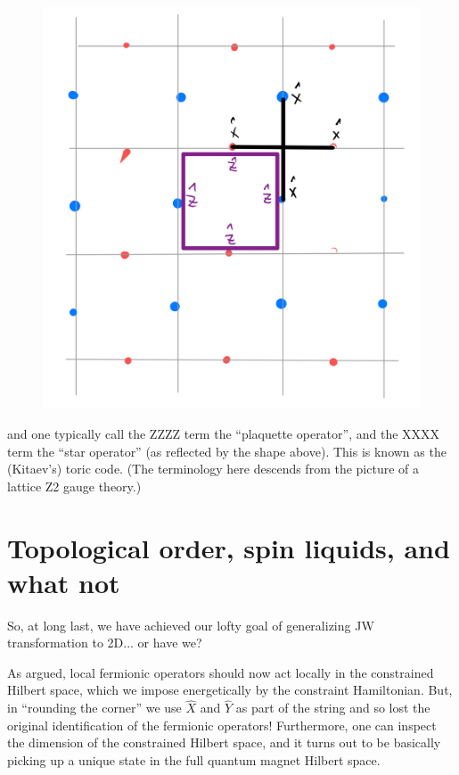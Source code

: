 \begin{figure}[H]
    \centering
    \includegraphics[width=\textwidth]{jupyterbook/data/fig/lec26-fig20.png}
\end{figure}
and one typically call the ZZZZ term the ``plaquette operator'', and the XXXX term the ``star operator'' (as reflected by the shape above). This is known as the (Kitaev's) toric code. (The terminology here descends from the picture of a lattice Z2 gauge theory.)

\section{Topological order, spin liquids, and what not}

So, at long last, we have achieved our lofty goal of generalizing JW transformation to 2D... or have we?

As argued, local fermionic operators should now act locally in the constrained Hilbert space, which we impose energetically by the constraint Hamiltonian. But, in ``rounding the corner'' we use $\hat{X}$ and $\hat{Y}$ as part of the string and so lost the original identification of the fermionic operators! Furthermore, one can inspect the dimension of the constrained Hilbert space, and it turns out to be basically picking up a unique state in the full quantum magnet Hilbert space.

